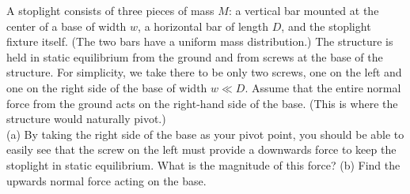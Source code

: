 A stoplight consists of three pieces of mass $M$: a vertical bar
mounted at the center of a base of width $w$, a horizontal bar of
length $D$, and the stoplight fixture itself. (The two bars have a
uniform mass distribution.) The structure is held in static
equilibrium from the ground and from screws at the base of the
structure. For simplicity, we take there to be only two screws, one
on the left and one on the right side of the base of width $w \ll D$.
Assume that the entire normal force from the ground acts on the
right-hand side of the base. (This is where the structure would
naturally pivot.)\\
%
(a) By taking the right side of the base as your pivot point, you
should be able to easily see that the screw on the left must provide
a downwards force to keep the stoplight in static equilibrium. What
is the magnitude of this force?\answercheck\hwendpart
%
(b) Find the upwards normal force acting on the base.\answercheck
